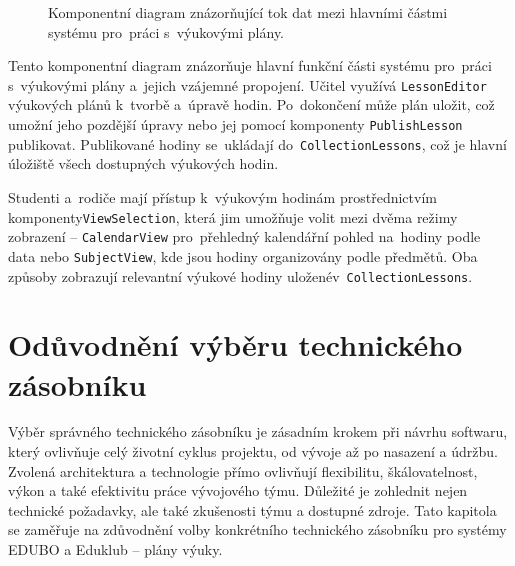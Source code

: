 \documentclass[male,czech,api_bc]{kitheses}
\begin{document}
\begin{figure}[H]
	\centering
	\caption{Komponentní diagram znázorňující tok dat mezi hlavními částmi systému pro~práci s~výukovými plány.}
	\label{fig:component-diagram}
\end{figure}

Tento komponentní diagram znázorňuje hlavní funkční části systému pro~práci s~výukovými plány a~jejich vzájemné propojení. Učitel využívá \texttt{LessonEditor} výukových plánů k~tvorbě a~úpravě hodin. Po~dokončení může plán uložit, což umožní jeho pozdější úpravy nebo jej pomocí komponenty \texttt{PublishLesson} publikovat. Publikované hodiny se~ukládají do~\texttt{CollectionLessons}, což je hlavní úložiště všech dostupných výukových hodin.

Studenti a~rodiče mají přístup k~výukovým hodinám prostřednictvím komponenty\break\texttt{ViewSelection}, která jim umožňuje volit mezi dvěma režimy zobrazení – \texttt{CalendarView} pro~přehledný kalendářní pohled na~hodiny podle data nebo \texttt{SubjectView}, kde jsou hodiny organizovány podle předmětů. Oba způsoby zobrazují relevantní výukové hodiny uložené\break v~\texttt{CollectionLessons}.



\section{Odůvodnění výběru technického zásobníku}

Výběr správného technického zásobníku je zásadním krokem při návrhu softwaru, který ovlivňuje celý životní cyklus projektu, od vývoje až po nasazení a údržbu. Zvolená architektura a technologie přímo ovlivňují flexibilitu, škálovatelnost, výkon a také efektivitu práce vývojového týmu. Důležité je zohlednit nejen technické požadavky, ale také zkušenosti týmu a dostupné zdroje. Tato kapitola se zaměřuje na zdůvodnění volby konkrétního technického zásobníku pro systémy EDUBO a Eduklub – plány výuky.
\end{document}
